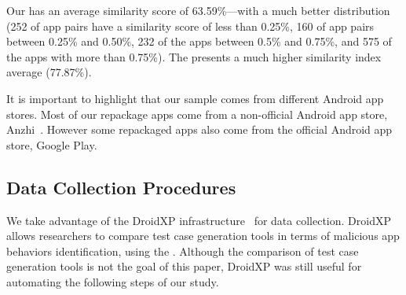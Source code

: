 Our \cds has an average similarity score of 63.59\%---with a much better distribution (252 of
app pairs have a similarity score of less than 0.25\%, 160 of app pairs
between 0.25\% and 0.50\%, 232 of the apps between 0.5\% and 0.75\%,
and 575 of the apps with more than 0.75\%). The \sds presents a much higher
similarity index average (77.87\%). 

It is important to highlight that our sample comes
from different Android app stores. Most of our repackage apps come from a non-official
Android app store, Anzhi~\cite{anzhi}. However some repackaged apps also come from the
official Android app store, Google Play.




\subsection{Data Collection Procedures} \label{sec:dataCollectionProc}

We take advantage of the DroidXP infrastructure~\cite{DBLP:conf/scam/CostaMCMVBC20}
for data collection. DroidXP allows researchers to compare 
test case generation tools in terms of malicious app behaviors identification, using the \mas. Although the comparison of test
case generation tools is not the goal of this paper, DroidXP
was still useful for automating the following steps of our study.


